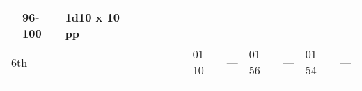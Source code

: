\begin{longtable}{llllllllllllll}
{\begin{minipage}[t]{1.150in}
\end{minipage}} & \multicolumn{1}{|p{0.393in}|}{\begin{minipage}[t]{0.393in}\raggedright
96-100\end{minipage}} & \multicolumn{1}{p{0.469in}|}{\begin{minipage}[t]{0.469in}\raggedright
1d10 x 10 pp\end{minipage}} & \multicolumn{1}{p{0.923in}|}{\begin{minipage}[t]{0.923in}\raggedright
\end{minipage}} & \multicolumn{1}{p{0.469in}|}{\begin{minipage}[t]{0.469in}\raggedright
\end{minipage}} & \multicolumn{1}{p{0.626in}|}{\begin{minipage}[t]{0.626in}\raggedright
\end{minipage}} & \multicolumn{1}{p{0.469in}|}{\begin{minipage}[t]{0.469in}\centering
\end{minipage}}\\
\hline
\multicolumn{8}{p{1.150in}|}{\begin{minipage}[t]{1.150in}\centering
6th\end{minipage}} & \multicolumn{1}{|p{0.393in}|}{\begin{minipage}[t]{0.393in}\raggedright
01-10\end{minipage}} & \multicolumn{1}{p{0.469in}|}{\begin{minipage}[t]{0.469in}\raggedright
---\end{minipage}} & \multicolumn{1}{p{0.923in}|}{\begin{minipage}[t]{0.923in}\raggedright
01-56\end{minipage}} & \multicolumn{1}{p{0.469in}|}{\begin{minipage}[t]{0.469in}\raggedright
---\end{minipage}} & \multicolumn{1}{p{0.626in}|}{\begin{minipage}[t]{0.626in}\raggedright
01-54\end{minipage}} & \multicolumn{1}{p{0.469in}|}{\begin{minipage}[t]{0.469in}\centering
---\end{minipage}}\\
\hline
\multicolumn{8}{p{1.150in}|}{\begin{minipage}[t]{1.150in}\centering
\end{minipage}} & \multicolumn{1}{|p{0.393in}|}{\begin{minipage}[t]{0.393in}\raggedright

\end{minipage}}
\end{longtable}
